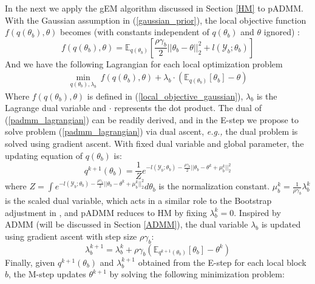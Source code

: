 \documentclass{article}
\newcommand{\eg}[0]{\emph{e.g., }}
\newcommand{\1}[0]{\ensuremath{\boldsymbol{1}}\xspace}
\begin{document}
In the next we apply the gEM algorithm discussed in Section \ref{HM} to pADMM. With the Gaussian assumption in (\ref{gaussian_prior}), the local objective function $f(q(\theta_b), \theta)$ becomes (with constants independent of $q(\theta_b)$ and $\theta$ ignored) :
\begin{equation}\label{local_objective_gaussian}
f(q(\theta_b), \theta) = \mathbb{E}_{q(\theta_b)}\left[\frac{\rho\gamma_b}{2}||\theta_b - \theta||_2^2 + l(\mathcal{Y}_b; \theta_b)\right]
\end{equation}
And we have the following Lagrangian for each local optimization problem
\begin{equation}\label{padmm_lagrangian}
\begin{gathered}
\textstyle \min_{q(\theta_b), \lambda_b} ~ f(q(\theta_b), \theta) + \lambda_b\cdot(\mathbb{E}_{q(\theta_b)}[\theta_b]- \theta)
\end{gathered}
\end{equation}
Where $f(q(\theta_b), \theta)$ is defined in (\ref{local_objective_gaussian}), $\lambda_b$ is the Lagrange dual variable and $\cdot$ represents the dot product. The dual of (\ref{padmm_lagrangian}) can be readily derived, and in the E-step we propose to solve problem (\ref{padmm_lagrangian}) via dual ascent, \eg the dual problem is solved using gradient ascent. With fixed dual variable and global parameter, the updating equation of $q(\theta_b)$ is:
\begin{equation}\label{padmm_primal_sol}
\textstyle q^{k+1}(\theta_b) = \frac{1}{Z}e^{-l(\mathcal{Y}_b; \theta_b) -  \frac{\rho\gamma_b}{2}||\theta_b-\theta^k + \mu^k_b||^2_2}
\end{equation}
where $Z = \int e^{-l(\mathcal{Y}_b; \theta_b) -  \frac{\rho\gamma_b}{2}||\theta_b-\theta^k + \mu^k_b||^2_2} d\theta_b$ is the normalization constant. $\mu^k_b = \frac{1}{\rho\gamma_b}\lambda^k_b$ is the scaled dual variable, which acts in a similar role to the Bootstrap adjustment in \cite{YZhang2012}, and pADMM reduces to HM by fixing $\lambda^k_b = 0$. Inspired by ADMM (will be discussed in Section \ref{ADMM}), the dual variable $\lambda_b$ is updated using gradient ascent with step size $\rho\gamma_b$:
\begin{equation}\label{padmm_dual_sol}
\lambda^{k+1}_b = \lambda^k_b + \rho\gamma_b(\mathbb{E}_{q^{k+1}(\theta_b)}[\theta_b] - \theta^k)
\end{equation}
Finally, given $q^{k+1}(\theta_b)$ and $\lambda^{k+1}_b$ obtained from the E-step for each local block $b$, the M-step updates $\theta^{k+1}$ by solving the following minimization problem:
\end{document}
